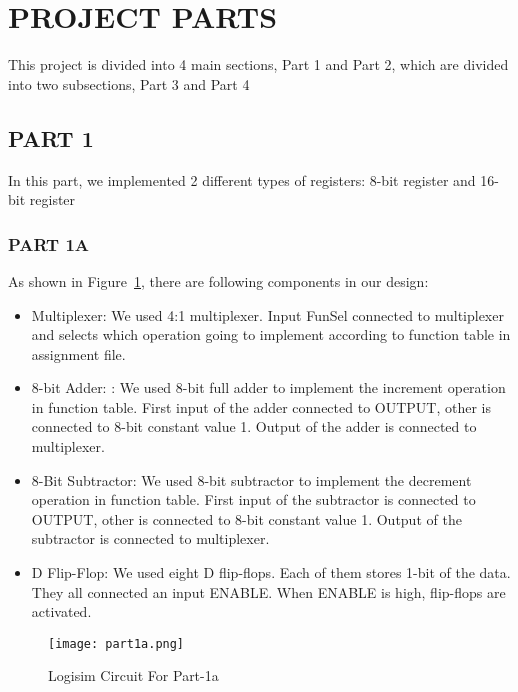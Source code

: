 \documentclass[pdftex,12pt,a4paper]{article}
\begin{document}
\section{PROJECT PARTS}
This project is divided into 4 main sections, Part 1 and Part 2, which are divided into two subsections,  Part 3 and Part 4

\subsection{PART 1}
In this part, we implemented 2 different types of registers: 8-bit register and 16-bit register


\subsubsection{PART 1A}

As shown in Figure~\ref{fig1}, there are following components in our design:
\begin{itemize}
\item Multiplexer: We used 4:1 multiplexer. Input FunSel connected to multiplexer and selects which operation going to implement according to function table in assignment file. 
\item 8-bit Adder: : We used 8-bit full adder to implement the increment operation in function table. First input of the adder connected to OUTPUT, other is connected to 8-bit constant value 1. Output of the adder is connected to multiplexer.
\item 8-Bit Subtractor: We used 8-bit subtractor to implement the decrement operation in function table. First input of the subtractor is connected to OUTPUT, other is connected to 8-bit constant value 1. Output of the subtractor is connected to multiplexer.
\item D Flip-Flop: We used eight D flip-flops. Each of them stores 1-bit of the data. They all connected an input ENABLE. When ENABLE is high, flip-flops are activated.
\end{itemize}

\begin{figure}[H]
	\centering
	\texttt{[image: part1a.png]}	
	\caption{Logisim Circuit For Part-1a}
	\label{fig1}
\end{figure}
\end{document}
